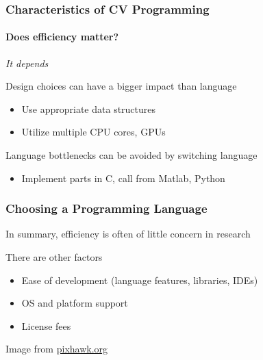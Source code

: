 \documentclass[xetex,professionalfont]{beamer}
\begin{document}

\begin{frame}
\frametitle{Characteristics of CV Programming}
\framesubtitle{Does efficiency matter?}

\emph{It depends}

\bigskip
Design choices can have a bigger impact than language
\begin{itemize}
	\item Use appropriate data structures
	\item Utilize multiple CPU cores, GPUs
\end{itemize}

\bigskip
Language bottlenecks can be avoided by switching language
\begin{itemize}
	\item Implement parts in C, call from Matlab, Python
\end{itemize}

\end{frame}


\begin{frame}
\frametitle{Choosing a Programming Language}

In summary, efficiency is often of little concern in research

\bigskip
There are other factors
\begin{itemize}
	\item Ease of development (language features, libraries, IDEs)
	\item OS and platform support %
	\item License fees %
\end{itemize}

\begin{center}
	{\centering Image from \url{pixhawk.org}}
\end{center}

\end{frame}
\end{document}
